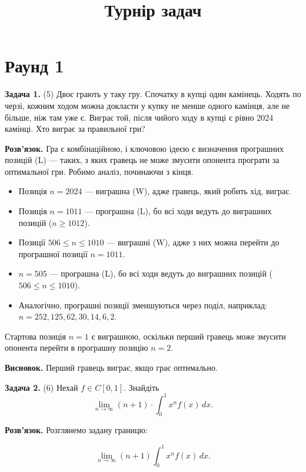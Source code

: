 \documentclass{article}
\begin{document}
\title{\textbf{Турнір задач}}
\author{}
\date{}

\maketitle

\section*{\centering \textbf{Раунд 1}}

\textbf{Задача 1.} (5) Двоє грають у таку гру. Спочатку в купці один камінець. Ходять по черзі, кожним ходом можна докласти у купку не менше одного камінця, але не більше, ніж там уже є. Виграє той, після чийого ходу в купці є рівно 2024 камінці. Хто виграє за правильної гри?

\textbf{Розв’язок.} Гра є комбінаційною, і ключовою ідеєю є визначення програшних позицій (L) — таких, з яких гравець не може змусити опонента програти за оптимальної гри. Робимо аналіз, починаючи з кінця.

\begin{itemize}
    \item Позиція \( n = 2024 \) — виграшна (W), адже гравець, який робить хід, виграє.
    \item Позиція \( n = 1011 \) — програшна (L), бо всі ходи ведуть до виграшних позицій (\( n \geq 1012 \)).
    \item Позиції \( 506 \leq n \leq 1010 \) — виграшні (W), адже з них можна перейти до програшної позиції \( n = 1011 \).
    \item \( n = 505 \) — програшна (L), бо всі ходи ведуть до виграшних позицій (\( 506 \leq n \leq 1010 \)).
    \item Аналогічно, програшні позиції зменшуються через поділ, наприклад: \( n = 252, 125, 62, 30, 14, 6, 2 \).
\end{itemize}

Стартова позиція \( n = 1 \) є виграшною, оскільки перший гравець може змусити опонента перейти в програшну позицію \( n = 2 \).

\textbf{Висновок.} Перший гравець виграє, якщо грає оптимально.

\bigskip

\noindent\textbf{Задача 2.} (6) Нехай \( f \in C[0, 1] \). Знайдіть  
\[
\lim_{n \to \infty} (n + 1) \cdot \int_{0}^{1} x^n f(x) \, dx.
\]

\textbf{Розв’язок.} Розглянемо задану границю:

\[
\lim_{n \to \infty} (n + 1) \int_0^1 x^n f(x)\,dx.
\]
\end{document}
